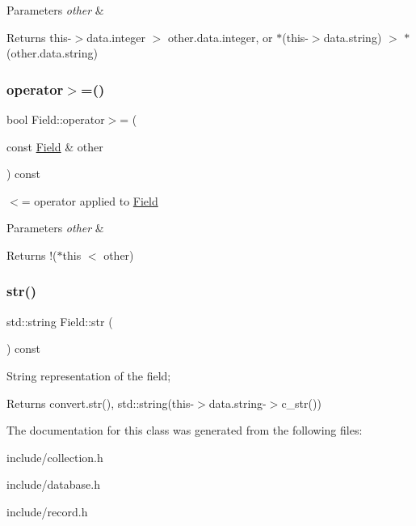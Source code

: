 \begin{DoxyParams}{Parameters}
{\em other} & \\
\hline
\end{DoxyParams}
\begin{DoxyReturn}{Returns}
this-\/$>$data.\+integer $>$ other.\+data.\+integer, or $\ast$(this-\/$>$data.\+string) $>$ $\ast$(other.\+data.\+string) 
\end{DoxyReturn}
\mbox{\label{struct_field_a6d179b2016926bfd9a9e7785a70038d3}} 
\subsubsection{\texorpdfstring{operator$>$=()}{operator>=()}}
{\footnotesize\ttfamily bool Field\+::operator$>$= (\begin{DoxyParamCaption}\item[{const \hyperlink{struct_field}{Field} \&}]{other }\end{DoxyParamCaption}) const}

$<$= operator applied to \hyperlink{struct_field}{Field}


\begin{DoxyParams}{Parameters}
{\em other} & \\
\hline
\end{DoxyParams}
\begin{DoxyReturn}{Returns}
!($\ast$this $<$ other) 
\end{DoxyReturn}
\mbox{\label{struct_field_a75a5e874f066c7877a54e760fdfd4aac}} 
\subsubsection{\texorpdfstring{str()}{str()}}
{\footnotesize\ttfamily std\+::string Field\+::str (\begin{DoxyParamCaption}{ }\end{DoxyParamCaption}) const}

String representation of the field;

\begin{DoxyReturn}{Returns}
convert.\+str(), std\+::string(this-\/$>$data.\+string-\/$>$c\+\_\+str()) 
\end{DoxyReturn}


The documentation for this class was generated from the following files\+:\begin{DoxyCompactItemize}
\item 
include/collection.\+h\item 
include/database.\+h\item 
include/record.\+h\end{DoxyCompactItemize}
